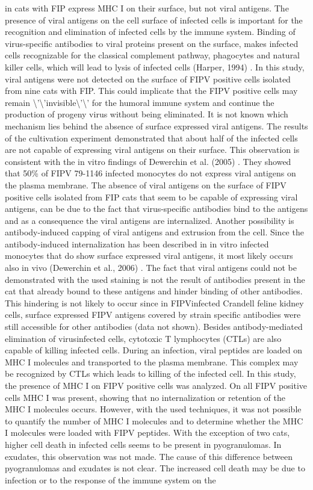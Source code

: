 \documentclass[11pt]{article}
\begin{document}
\begin{description}
in cats with FIP express MHC I on their surface, but not viral antigens. The presence of viral antigens on the cell surface of infected cells is important for the recognition and elimination of infected cells by the immune system. Binding of virus-specific antibodies to viral proteins present on the surface, makes infected cells recognizable for the classical complement pathway, phagocytes and natural killer cells, which will lead to lysis of infected cells (Harper, 1994) . In this study, viral antigens were not detected on the surface of FIPV positive cells isolated from nine cats with FIP. This could implicate that the FIPV positive cells may remain \textbackslash{}'\textbackslash{}'invisible\textbackslash{}'\textbackslash{}' for the humoral immune system and continue the production of progeny virus without being eliminated. It is not known which mechanism lies behind the absence of surface expressed viral antigens. The results of the cultivation experiment demonstrated that about half of the infected cells are not capable of expressing viral antigens on their surface. This observation is consistent with the in vitro findings of Dewerchin et al. (2005) . They showed that 50\% of FIPV 79-1146 infected monocytes do not express viral antigens on the plasma membrane. The absence of viral antigens on the surface of FIPV positive cells isolated from FIP cats that seem to be capable of expressing viral antigens, can be due to the fact that virus-specific antibodies bind to the antigens and as a consequence the viral antigens are internalized. Another possibility is antibody-induced capping of viral antigens and extrusion from the cell. Since the antibody-induced internalization has been described in in vitro infected monocytes that do show surface expressed viral antigens, it most likely occurs also in vivo (Dewerchin et al., 2006) . The fact that viral antigens could not be demonstrated with the used staining is not the result of antibodies present in the cat that already bound to these antigens and hinder binding of other antibodies. This hindering is not likely to occur since in FIPVinfected Crandell feline kidney cells, surface expressed FIPV antigens covered by strain specific antibodies were still accessible for other antibodies (data not shown). Besides antibody-mediated elimination of virusinfected cells, cytotoxic T lymphocytes (CTLs) are also capable of killing infected cells. During an infection, viral peptides are loaded on MHC I molecules and transported to the plasma membrane. This complex may be recognized by CTLs which leads to killing of the infected cell. In this study, the presence of MHC I on FIPV positive cells was analyzed. On all FIPV positive cells MHC I was present, showing that no internalization or retention of the MHC I molecules occurs. However, with the used techniques, it was not possible to quantify the number of MHC I molecules and to determine whether the MHC I molecules were loaded with FIPV peptides. With the exception of two cats, higher cell death in infected cells seems to be present in pyogranulomas. In exudates, this observation was not made. The cause of this difference between pyogranulomas and exudates is not clear. The increased cell death may be due to infection or to the response of the immune system on the 
\end{description}
\end{document}
